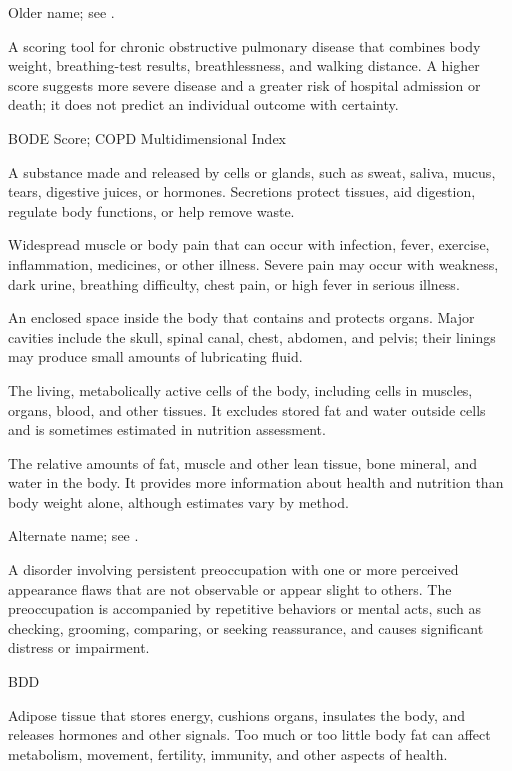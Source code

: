  Older name; see .

 A scoring tool for chronic obstructive pulmonary disease that combines body weight, breathing-test results, breathlessness, and walking distance. A higher score suggests more severe disease and a greater risk of hospital admission or death; it does not predict an individual outcome with certainty.

\synonyms
BODE Score; COPD Multidimensional Index

 A substance made and released by cells or glands, such as sweat, saliva, mucus, tears, digestive juices, or hormones. Secretions protect tissues, aid digestion, regulate body functions, or help remove waste.

 Widespread muscle or body pain that can occur with infection, fever, exercise, inflammation, medicines, or other illness. Severe pain may occur with weakness, dark urine, breathing difficulty, chest pain, or high fever in serious illness.

 An enclosed space inside the body that contains and protects organs. Major cavities include the skull, spinal canal, chest, abdomen, and pelvis; their linings may produce small amounts of lubricating fluid.

 The living, metabolically active cells of the body, including cells in muscles, organs, blood, and other tissues. It excludes stored fat and water outside cells and is sometimes estimated in nutrition assessment.

 The relative amounts of fat, muscle and other lean tissue, bone mineral, and water in the body. It provides more information about health and nutrition than body weight alone, although estimates vary by method.

 Alternate name; see .

 A disorder involving persistent preoccupation with one or more perceived appearance flaws that are not observable or appear slight to others.
The preoccupation is accompanied by repetitive behaviors or mental acts, such as
checking, grooming, comparing, or seeking reassurance, and causes significant
distress or impairment.

\synonyms
BDD

 Adipose tissue that stores energy, cushions organs, insulates the body, and releases hormones and other signals. Too much or too little body fat can affect metabolism, movement, fertility, immunity, and other aspects of health.

